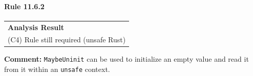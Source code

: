 \paragraph{Rule 11.6.2}
\begin{longtable}{p{13cm}}
\textbf{Analysis Result} \\
(C4) Rule still required (unsafe Rust) \\
\end{longtable}
\textbf{Comment:} \texttt{MaybeUninit} can be used to initialize an empty value and read it from it within an \texttt{unsafe} context. \\


